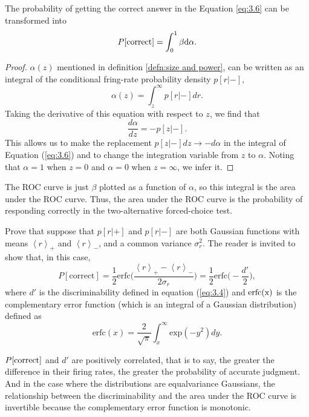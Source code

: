 \begin{prop}
  \label{prop:size}
The probability of getting the correct answer in the
Equation \ref{eq:3.6} can be transformed into
\begin{equation}
  \label{eq:3.5}
  P[\rm{correct}]=\int_0^1\beta d\alpha.
\end{equation}

 \begin{proof} 
   $\alpha(z)$ mentioned in definition \ref{defn:size and power}, can
be written as an integral of the conditional fring-rate probability density
$p[r|-]$,
\begin{equation}
  \label{eq:3.7}
  \alpha(z)=\int_{z}^{\infty}{p[r|-]dr}.
\end{equation}
   Taking the derivative of this equation with respect to $z$, we find
   that
   \begin{equation*}
       \label{eq:3.8}
       \frac{d\alpha}{dz}=-p[z|-].
     \end{equation*}
     This allows us to make the replacement $p[z|-]dz\rightarrow
     -d\alpha$ in the integral of Equation (\ref{eq:3.6}) and to change
     the integration variable from $z$ to $\alpha$. Noting that
     $\alpha=1$ when $z=0$ and $\alpha=0$ when $z=\infty$, we infer it.
\end{proof}
\end{prop}
\begin{rem}
  The ROC curve is just $\beta$ plotted as a function of $\alpha$, so
this integral is the area under the ROC curve. Thus, the area under
the ROC curve is the probability of responding correctly in the two-alternative forced-choice test.
\end{rem}

\begin{exc}
  Prove that suppose that $p[r|+]$ and $p[r|-]$ are both Gaussian functions with means
$\left\langle r \right\rangle_{+}$ and $\left\langle r
\right\rangle_{-}$, and a common variance $\sigma_r^{2}$. The reader
is invited to show that, in this case,
\begin{equation}
  \label{eq:3.10}
  P[\text{correct}]=\frac{1}{2}\text{erfc} \Big(\frac{
    \left<r\right>_{+}-\left<r\right>_{-}}{2\sigma_{r}}\Big)=\frac{1}{2}\text{erfc} \Big( -\frac{d'}{2} \Big),
\end{equation}
where $d'$ is the discriminability defined in equation (\ref{eq:3.4})
and $\rm{erfc}(x)$ is the complementary error function (which is an integral of a Gaussian distribution) defined as
\begin{equation*}
  \label{eq:3.11}
  \text{erfc}(x)=\frac{2}{\sqrt{\pi}}\int_x^{\infty}\text{exp}(-y^{2})dy.
\end{equation*}
\end{exc}
\begin{rem}
  $P[\rm{correct}]$ and $d'$ are positively correlated, that is to
  say,  the greater the difference in their firing rates, the greater
  the probability of accurate judgment. And in the case where the
  distributions are equalvariance Gaussians, the relationship between
  the discriminability and the area under the ROC curve is invertible because the complementary error function is monotonic.
\end{rem}

